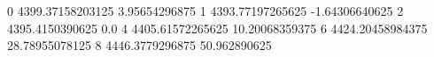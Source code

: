 0 4399.37158203125 3.95654296875
1 4393.77197265625 -1.64306640625
2 4395.4150390625 0.0
4 4405.61572265625 10.20068359375
6 4424.20458984375 28.78955078125
8 4446.3779296875 50.962890625
